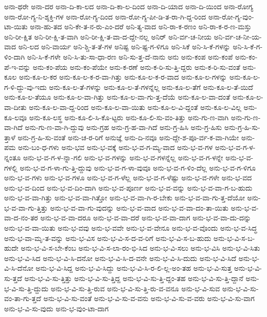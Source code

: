 {ಅನಾ-ಥರೇ
ಅನಾ-ದರ
ಅನಾ-ದಿ-ಕಾ-ಲದ
ಅನಾ-ದಿ-ಕಾ-ಲ-ದಿಂದ
ಅನಾ-ದಿ-ಯಾದ
ಅನಾ-ದಿ-ಯಿಂದ
ಅನಾ-ರೋಗ್ಯ
ಅನಾ-ರೋ-ಗ್ಯ-ನಿ-ಶ್ಶಕ್ತಿ-ಗಳ
ಅನಾ-ರೋ-ಗ್ಯ-ದಿಂದ
ಅನಾ-ರೋ-ಗ್ಯ-ಪೀ-ಡಿ-ತ-ರಾ-ಗಿ-ದ್ದ-ರಿಂದ
ಅನಾ-ರೋ-ಗ್ಯ-ವುಂ-ಟಾ-ಯಿತು
ಅನಾ-ಹು-ತದ
ಅನಿ-ಕೇ-ತ-ನ-ರು-ಎಂ-ದರೆ
ಅನಿ-ತ್ಯ-ವಾದ
ಅನಿ-ರಾ-ಕ-ರಣಂ
ಅನಿ-ರಾ-ಕ-ರ-ಣ-ಮಸ್ತು
ಅನಿ-ರೀ-ಕ್ಷಿತ
ಅನಿ-ರೀ-ಕ್ಷಿ-ತ-ವಾಗಿ
ಅನಿ-ರೀ-ಕ್ಷಿ-ತ-ವಾ-ದ-ದ್ದೇ-ನಲ್ಲ
ಅನಿರ್
ಅನಿ-ರ್ವ-ಚ-ನೀಯ
ಅನಿ-ರ್ವ-ಚ-ನೀ-ಯ-ವಾದ
ಅನಿ-ಲದ
ಅನಿ-ವಾರ್ಯ
ಅನಿ-ಶ್ಚಿ-ತ-ತೆ-ಗಳ
ಅನಿಷ್ಟ
ಅನಿ-ಷ್ಟ-ಗ-ಳಿಗೂ
ಅನಿ-ಸಿಕೆ
ಅನಿ-ಸಿ-ಕೆ-ಗಳನ್ನು
ಅನಿ-ಸಿ-ಕೆ-ಗ-ಳಿಂ-ದಾಗಿ
ಅನಿ-ಸಿ-ಕೆ-ಗಳೇ
ಅನಿ-ಸಿ-ತು-ಸಾ-ಧಾ-ರಣ
ಅನಿ-ಸು-ತ್ತ-ದೆ-ನಾನು
ಅನು
ಅನು-ಕಂಪ
ಅನು-ಕಂಪೆ
ಅನು-ಕಂ-ಪೆ-ಇ-ವನ್ನು
ಅನು-ಕಂ-ಪೆಯ
ಅನು-ಕಂ-ಪೆಯೇ
ಅನು-ಕ-ರಣೆ
ಅನು-ಕ-ರಿ-ಸು-ತ್ತಿ-ದ್ದರು
ಅನು-ಕ-ರಿ-ಸು-ವಂತೆ
ಅನು-ಕೂಲ
ಅನು-ಕೂ-ಲ-ಕರ
ಅನು-ಕೂ-ಲ-ಕ-ರ-ವಾ-ಗಿತ್ತು
ಅನು-ಕೂ-ಲ-ಕ-ರ-ವಾದ
ಅನು-ಕೂ-ಲ-ಗಳನ್ನು
ಅನು-ಕೂ-ಲ-ಗ-ಳಿ-ದ್ದು-ವು-ಇದು
ಅನು-ಕೂ-ಲ-ತೆ-ಗಳನ್ನು
ಅನು-ಕೂ-ಲ-ತೆ-ಗಳನ್ನೆಲ್ಲ
ಅನು-ಕೂ-ಲ-ತೆಗೆ
ಅನು-ಕೂ-ಲ-ತೆ-ಯಿದೆ
ಅನು-ಕೂ-ಲ-ತೆಯೂ
ಅನು-ಕೂ-ಲ-ವಾ-ಗಿತ್ತು
ಅನು-ಕೂ-ಲ-ವಾ-ಗು-ತ್ತ-ದೆಯೆ
ಅನು-ಕೂ-ಲ-ವಾ-ದಂತೆ
ಅನು-ಕೂ-ಲ-ವಾ-ದೀತು
ಅನು-ಕೂ-ಲ-ವಾ-ದ್ದ-ರಿಂದ
ಅನು-ಕೂ-ಲ-ವಾ-ಯಿತು
ಅನು-ಕೂ-ಲ-ವಿ-ದ್ದಂತೆ
ಅನು-ಕೂ-ಲ-ವಿಲ್ಲ
ಅನು-ಕೂ-ಲವೂ
ಅನು-ಕೂ-ಲಸ್ಥ
ಅನು-ಕೂ-ಲಿ-ಸಿ-ಕೊ-ಟ್ಟರು
ಅನು-ಕೂ-ಲಿ-ಸು-ವಂ-ತಿತ್ತು
ಅನು-ಗು-ಣ-ವಾಗಿ
ಅನು-ಗು-ಣ-ವಾ-ಗಿದೆ
ಅನು-ಗು-ಣ-ವಾ-ಗಿ-ದ್ದುವು
ಅನು-ಗ್ರಹ
ಅನು-ಗ್ರ-ಹ-ವಾ-ಗಿದೆ
ಅನು-ಗ್ರ-ಹಿಸಿ
ಅನು-ಗ್ರ-ಹಿಸು
ಅನು-ಗ್ರ-ಹಿ-ಸು-ತ್ತಾಳೆ
ಅನು-ಗ್ರ-ಹಿ-ಸು-ವಂತೆ
ಅನು-ಚ-ರ-ರಿಗೆ
ಅನುಜ್ಞೆ
ಅನು-ದಿ-ನವೂ
ಅನು-ದ್ದೇ-ಶ-ಪೂ-ರ್ವ-ಕ-ವಾ-ಗಿಯೇ
ಅನು-ಪಮ
ಅನು-ಬಂ-ಧ-ಗಳು
ಅನು-ಭವ
ಅನು-ಭ-ವಕ್ಕೆ
ಅನು-ಭ-ವ-ಗ-ಮ್ಯ-ವಾದ
ಅನು-ಭ-ವ-ಗಳ
ಅನು-ಭ-ವ-ಗ-ಳ-ನ್ನಂತೂ
ಅನು-ಭ-ವ-ಗ-ಳ-ನ್ನಾ-ಗಲಿ
ಅನು-ಭ-ವ-ಗಳನ್ನು
ಅನು-ಭ-ವ-ಗಳನ್ನೆಲ್ಲ
ಅನು-ಭ-ವ-ಗ-ಳನ್ನೇ
ಅನು-ಭ-ವ-ಗಳಲ್ಲಿ
ಅನು-ಭ-ವ-ಗ-ಳಾ-ಗು-ತ್ತಿ-ದ್ದುವು
ಅನು-ಭ-ವ-ಗ-ಳಾ-ವುವೂ
ಅನು-ಭ-ವ-ಗ-ಳಿಂ-ದೆಲ್ಲ
ಅನು-ಭ-ವ-ಗ-ಳಿಗೂ
ಅನು-ಭ-ವ-ಗಳು
ಅನು-ಭ-ವ-ಗಳೂ
ಅನು-ಭ-ವ-ಗ-ಳೆಲ್ಲ
ಅನು-ಭ-ವ-ಗ-ಳೆಷ್ಟು
ಅನು-ಭ-ವ-ಗಳೇ
ಅನು-ಭ-ವದ
ಅನು-ಭ-ವ-ದಿಂದ
ಅನು-ಭ-ವ-ದಿಂ-ದಾಗಿ
ಅನು-ಭ-ವ-ಪೂರ್ಣ
ಅನು-ಭ-ವ-ವನ್ನು
ಅನು-ಭ-ವ-ವಾ-ಗ-ಬ-ಹುದು
ಅನು-ಭ-ವ-ವಾ-ಗಿತ್ತು
ಅನು-ಭ-ವ-ವಾ-ಗಿತ್ತೋ
ಅನು-ಭ-ವ-ವಾ-ಗಿ-ರ-ಬೇಕು
ಅನು-ಭ-ವ-ವಾ-ಗು-ತ್ತ-ದೆಯೋ
ಅನು-ಭ-ವ-ವಾ-ಗು-ತ್ತಿತ್ತು
ಅನು-ಭ-ವ-ವಾ-ಗು-ವುದನ್ನು
ಅನು-ಭ-ವ-ವಾದ
ಅನು-ಭ-ವ-ವಾ-ದಂ-ತಾ-ಯಿತು
ಅನು-ಭ-ವ-ವಾ-ದ-ನಂ-ತರ
ಅನು-ಭ-ವ-ವಾ-ದರೂ
ಅನು-ಭ-ವ-ವಾ-ದರೆ
ಅನು-ಭ-ವ-ವಾ-ದಾಗ
ಅನು-ಭ-ವ-ವಾ-ದು-ದನ್ನು
ಅನು-ಭ-ವ-ವಾ-ಯಿತು
ಅನು-ಭ-ವವು
ಅನು-ಭ-ವವೇ
ಅನು-ಭ-ವ-ವೇನೂ
ಅನು-ಭ-ವ-ವೊಂದು
ಅನು-ಭ-ವ-ಸಿದ್ಧ
ಅನು-ಭ-ವಾ-ಮೃ-ತ-ವನ್ನು
ಅನು-ಭ-ವಿಸ
ಅನು-ಭ-ವಿ-ಸ-ದ-ವ-ರಿಗೆ
ಅನು-ಭ-ವಿ-ಸ-ಬ-ಹುದು
ಅನು-ಭ-ವಿ-ಸ-ಬ-ಹುದೇ
ಅನು-ಭ-ವಿ-ಸ-ಬೇ-ಕೆಂಬ
ಅನು-ಭ-ವಿ-ಸ-ಲಾ-ರಂ-ಭಿ-ಸಿದ
ಅನು-ಭ-ವಿ-ಸಲು
ಅನು-ಭ-ವಿಸಿ
ಅನು-ಭ-ವಿ-ಸಿತು
ಅನು-ಭ-ವಿ-ಸಿದ
ಅನು-ಭ-ವಿ-ಸಿ-ದನೋ
ಅನು-ಭ-ವಿ-ಸಿ-ದ-ವನೇ
ಅನು-ಭ-ವಿ-ಸಿ-ದುದು
ಅನು-ಭ-ವಿ-ಸಿದೆ
ಅನು-ಭ-ವಿ-ಸಿ-ದೆನೋ
ಅನು-ಭ-ವಿ-ಸಿದ್ದ
ಅನು-ಭ-ವಿ-ಸಿದ್ದು
ಅನು-ಭ-ವಿ-ಸಿ-ರ-ಲಿ-ಲ್ಲ-ಅಂ-ತಹ
ಅನು-ಭ-ವಿ-ಸುತ್ತ
ಅನು-ಭ-ವಿ-ಸು-ತ್ತದೆ
ಅನು-ಭ-ವಿ-ಸು-ತ್ತಿತ್ತು
ಅನು-ಭ-ವಿ-ಸು-ತ್ತಿದ್ದ
ಅನು-ಭ-ವಿ-ಸು-ತ್ತಿ-ದ್ದಂ-ತಹ
ಅನು-ಭ-ವಿ-ಸು-ತ್ತಿ-ದ್ದಾನೆ
ಅನು-ಭ-ವಿ-ಸು-ತ್ತಿ-ದ್ದುದು
ಅನು-ಭ-ವಿ-ಸು-ತ್ತಿ-ರುವ
ಅನು-ಭ-ವಿ-ಸು-ತ್ತಿ-ರು-ವ-ವನೂ
ಅನು-ಭ-ವಿ-ಸುವ
ಅನು-ಭ-ವಿ-ಸು-ವಂ-ತಾ-ಗು-ತ್ತದೆ
ಅನು-ಭ-ವಿ-ಸು-ವಂತೆ
ಅನು-ಭ-ವಿ-ಸು-ವ-ವನು
ಅನು-ಭ-ವಿ-ಸು-ವ-ವರು
ಅನು-ಭ-ವಿ-ಸು-ವಾಗ
ಅನು-ಭ-ವಿ-ಸು-ವುದು
ಅನು-ಭ-ವುಂ-ಟಾ-ದಾಗ
}
